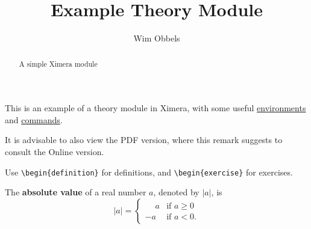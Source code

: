 \documentclass{ximera}
\begin{document}
    \author{Wim Obbels}
    \title{Example Theory Module}
    \begin{abstract}  A simple Ximera module \end{abstract}
    \maketitle
    \label{xim:ximeraDemo}

This is an example of a theory module in Ximera, 
with some useful \hyperref[xim:ximeraEnvironments]{environments} and \hyperref[xim:ximeraCommands]{commands}.

\begin{onlineOnly}
 \begin{remark}
    It is advisable to also view the PDF version, where this remark suggests to consult the Online version.
 \end{remark}
\end{onlineOnly}

Use \verb|\begin{definition}| for definitions, and \verb|\begin{exercise}| for exercises.

\begin{definition}\label{showcase:absolutevalue}
	The \textbf{absolute value} of a real number $a$, denoted by $|a|$, is
	\[
		|a| = \begin{cases}
				        \phantom{-}a  & \text{if } a \geq 0 \\
				                  -a  & \text{if } a<0.
			        \end{cases}
	\]
\end{definition}
\end{document}
